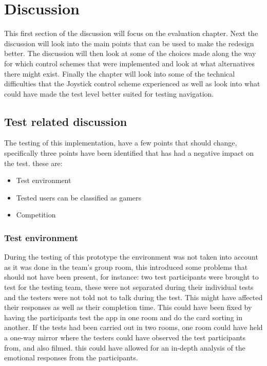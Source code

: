 \chapter{Discussion}
This first section of the discussion will focus on the evaluation chapter. Next the discussion will look into the main points that can be used to make the redesign better. The discussion will then look at some of the choices made along the way for which control schemes that were implemented and look at what alternatives there might exist. Finally the chapter will look into some of the technical difficulties that the Joystick control scheme experienced as well as look into what could have made the test level better suited for testing navigation.

\section*{Test related discussion}
The testing of this implementation, have a few points that should change, specifically three points have been identified that has had a negative impact on the test. these are:

\begin{itemize}
\item Test environment
\item Tested users can be classified as gamers
\item Competition
\end{itemize}

\subsection*{Test environment}
During the testing of this prototype the environment was not taken into account as it was done in the team’s group room, this introduced some problems that should not have been present, for instance: two test participants were brought to test for the testing team, these were not separated during their individual tests and the testers were not told not to talk during the test. This might have affected their responses as well as their completion time. This could have been fixed by having the participants test the app in one room and do the card sorting in another. If the tests had been carried out in two rooms, one room could have held a one-way mirror where the testers could have observed the test participants from, and also filmed. this could have allowed for an in-depth analysis of the emotional responses from the participants. 


